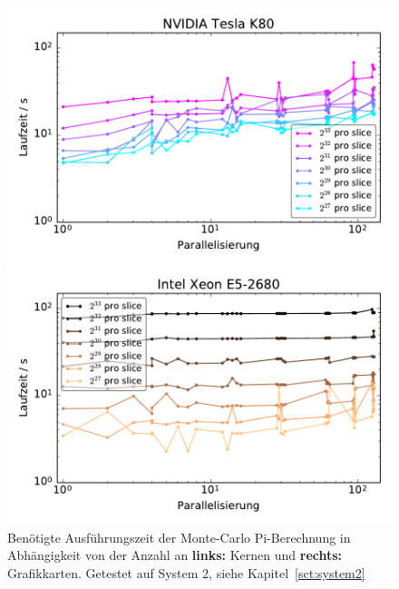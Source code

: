 \begin{figure}[H]
	\centering
	\begin{minipage}{0.5\linewidth}
		\includegraphics[width=\linewidth]{cluster-strong-scaling-gpu}
	\end{minipage}\begin{minipage}{0.5\linewidth}
		\includegraphics[width=\linewidth]{cluster-strong-scaling-cpu}
	\end{minipage}
	\caption{Benötigte Ausführungszeit der Monte-Carlo Pi-Berechnung in Abhängigkeit von der Anzahl an \textbf{links:} Kernen und \textbf{rechts:} Grafikkarten. Getestet auf System 2, siehe Kapitel~\ref{sct:system2}}
	\label{fig:montepistrongscaling}
\end{figure}

